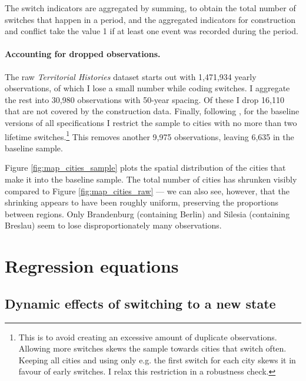 \documentclass[11pt, a4paper]{article}
\begin{document}
The switch indicators are aggregated by summing, to obtain the total number of switches that happen in a period, and the aggregated indicators for construction and conflict take the value 1 if at least one event was recorded during the period. 

\paragraph{Accounting for dropped observations.}

The raw \textit{Territorial Histories} dataset starts out with 1,471,934 yearly observations, of which I lose a small number while coding switches. I aggregate the rest into 30,980 observations with 50-year spacing. Of these I drop 16,110 that are not covered by the construction data. Finally, following \cite{schoenholzer2022}, for the baseline versions of all specifications I restrict the sample to cities with no more than two lifetime switches.\footnote
{
This is to avoid creating an excessive amount of duplicate observations. Allowing more switches skews the sample towards cities that switch often. Keeping all cities and using only e.g. the first switch for each city skews it in favour of early switches. I relax this restriction in a robustness check.
} 
This removes another 9,975 observations, leaving 6,635 in the baseline sample.

Figure \ref{fig:map_cities_sample} plots the spatial distribution of the cities that make it into the baseline sample. The total number of cities has shrunken visibly compared to Figure \ref{fig:map_cities_raw} --- we can also see, however, that the shrinking appears to have been roughly uniform, preserving the proportions between regions. Only Brandenburg (containing Berlin) and Silesia (containing Breslau) seem to lose disproportionately many observations.


\section{Regression equations} \label{sec:empirics}

\subsection{Dynamic effects of switching to a new state}
\end{document}
